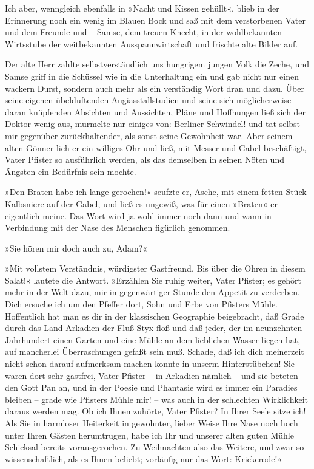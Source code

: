 Ich aber, wenngleich ebenfalls in »Nacht und Kissen gehüllt«, blieb
in der Erinnerung noch ein wenig im Blauen Bock und saß mit dem
verstorbenen Vater und dem Freunde und – Samse, dem treuen Knecht,
in der wohlbekannten Wirtsstube der weitbekannten
Ausspannwirtschaft und frischte alte Bilder auf.

Der alte Herr zahlte selbstverständlich uns hungrigem jungen Volk
die Zeche, und Samse griff in die Schüssel wie in die Unterhaltung
ein und gab nicht nur einen wackern Durst, sondern auch mehr als
ein verständig Wort dran und dazu. Über seine eigenen übelduftenden
Augiasstallstudien und seine sich möglicherweise daran knüpfenden
Absichten und Aussichten, Pläne und Hoffnungen ließ sich der Doktor
wenig aus, murmelte nur einiges von: Berliner Schwindel! und tat
selbst mir gegenüber zurückhaltender, als sonst seine Gewohnheit
war. Aber seinem alten Gönner lieh er ein williges Ohr und ließ,
mit Messer und Gabel beschäftigt, Vater Pfister so ausführlich
werden, als das demselben in seinen Nöten und Ängsten ein Bedürfnis
sein mochte.

»Den Braten habe ich lange gerochen!« seufzte er, Asche, mit einem
fetten Stück Kalbsniere auf der Gabel, und ließ es ungewiß, was für
einen »Braten« er eigentlich meine. Das Wort wird ja wohl immer
noch dann und wann in Verbindung mit der Nase des Menschen
figürlich genommen.

»Sie hören mir doch auch zu, Adam?«

»Mit vollstem Verständnis, würdigster Gastfreund. Bis über die
Ohren in diesem Salat!« lautete die Antwort. »Erzählen Sie ruhig
weiter, Vater Pfister; es gehört mehr in der Welt dazu, mir in
gegenwärtiger Stunde den Appetit zu verderben. Dich ersuche ich um
den Pfeffer dort, Sohn und Erbe von Pfisters Mühle. Hoffentlich hat
man es dir in der klassischen Geographie beigebracht, daß Grade
durch das Land Arkadien der Fluß Styx floß und daß jeder, der im
neunzehnten Jahrhundert einen Garten und eine Mühle an dem
lieblichen Wasser liegen hat, auf mancherlei Überraschungen gefaßt
sein muß. Schade, daß ich dich meinerzeit nicht schon darauf
aufmerksam machen konnte in unserm Hinterstübchen! Sie waren dort
sehr gastfrei, Vater Pfister – in Arkadien nämlich – und sie
beteten den Gott Pan an, und in der Poesie und Phantasie wird es
immer ein Paradies bleiben – grade wie Pfisters Mühle mir! – was
auch in der schlechten Wirklichkeit daraus werden mag. Ob ich Ihnen
zuhörte, Vater Pfister? In Ihrer Seele sitze ich! Als Sie in
harmloser Heiterkeit in gewohnter, lieber Weise Ihre Nase noch hoch
unter Ihren Gästen herumtrugen, habe ich Ihr und unserer alten
guten Mühle Schicksal bereits vorausgerochen. Zu Weihnachten also
das Weitere, und zwar so wissenschaftlich, als es Ihnen beliebt;
vorläufig nur das Wort: Krickerode!«

